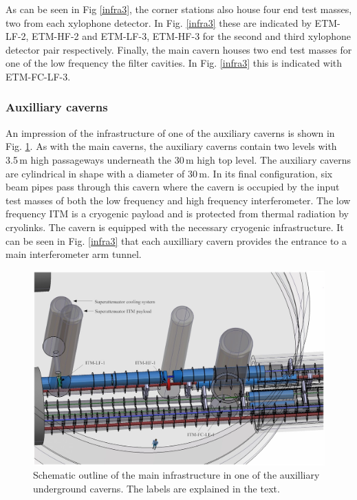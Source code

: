 As can be seen in Fig \ref{infra3}, the corner stations also house four end test masses, two from each xylophone detector. In Fig. \ref{infra3} these are indicated by ETM-LF-2, ETM-HF-2 and ETM-LF-3, ETM-HF-3 for the second and third xylophone detector pair respectively. Finally, the main cavern houses two end test masses for one of the low frequency the filter cavities. In Fig. \ref{infra3} this is indicated with ETM-FC-LF-3.






\FloatBarrier
\subsubsection*{Auxilliary caverns}

An impression of the infrastructure of one of the auxiliary caverns is shown in Fig. \ref{infra4}. As with the main caverns, the auxiliary caverns contain two levels with 3.5\,m high passageways underneath the 30\,m high top level. The auxiliary caverns are cylindrical in shape with a diameter of 30\,m. In its final configuration, six beam pipes pass through this cavern where the cavern is occupied by the input test masses of both the low frequency and high frequency interferometer. The low frequency ITM is a cryogenic payload and is protected from thermal radiation by cryolinks. The cavern is equipped with the necessary cryogenic infrastructure. It can be seen in Fig. \ref{infra3} that each auxilliary cavern provides the entrance to a main interferometer arm tunnel.

\begin{figure}[h!]
\centering
\includegraphics[width=16cm]{./Sec_SiteInfra/Figures/infra4.jpg}
\caption{Schematic outline of the main infrastructure in one of the auxilliary underground caverns.
The labels are explained in the text.}
\label{infra4}
\end{figure}

